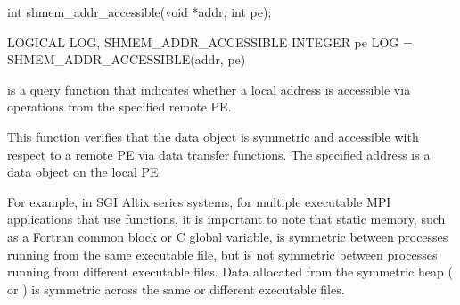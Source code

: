 \synC

int shmem_addr_accessible(void *addr, int pe);

\synF
LOGICAL LOG, SHMEM_ADDR_ACCESSIBLE
INTEGER pe
LOG = SHMEM_ADDR_ACCESSIBLE(addr, pe)


{
         is  a  query  function  that indicates whether a
       local address is accessible via \openshmem operations  from the  specified
       remote \ac{PE}.
       
       This function verifies that the data object is symmetric and accessible
       with respect to a remote \ac{PE} via \openshmem  data  transfer  functions.   The
       specified address  is a data object on the local \ac{PE}.

       For example, in  SGI Altix series systems, for multiple executable MPI applications
       that use \openshmem functions, it is important to note that  static  memory,
       such  as a  Fortran  common  block  or C global variable, is symmetric
       between processes running from the same executable  file,  but  is  not
       symmetric  between  processes  running from different executable files.
       Data allocated from  the symmetric  heap  ( or	)  is
       symmetric across the same or different executable files.
}
{
}
\eAPI
